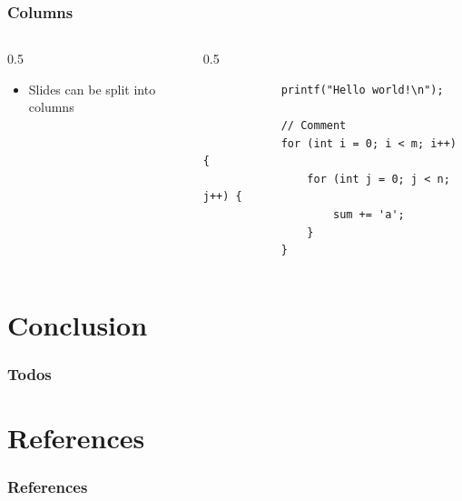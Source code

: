 \documentclass[
	aspectratio=169,
	compress,
	usepdftitle=false,
]{beamer}
\newcommand{\navframetitle}[1]{\frametitle{#1\hfill{\footnotesize\lastsection{}}}}
\begin{document}
\begin{frame}[fragile]
	\navframetitle{Columns}

	\begin{columns}
		\begin{column}{0.5\textwidth}
			\begin{itemize}
				\item Slides can be split into columns
			\end{itemize}
		\end{column}
		\begin{column}{0.5\textwidth}
			\begin{verbatim}
			printf("Hello world!\n");

			// Comment
			for (int i = 0; i < m; i++) {
				for (int j = 0; j < n; j++) {
					sum += 'a';
				}
			}
			\end{verbatim}
		\end{column}
	\end{columns}
\end{frame}

\section{Conclusion}
\label{sec:conclusion}

\begin{frame}
	\navframetitle{Todos}


	\lipsum[1]
\end{frame}

\appendix

\AtBeginSection[]{}
\AtBeginSubsection[]{}

\section{References}

\begin{frame}[allowframebreaks]
	\frametitle{References}

	
	
\end{frame}
\end{document}
